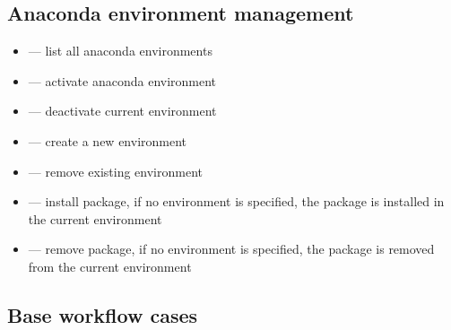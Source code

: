 \documentclass[12pt]{article}
\begin{document}
\subsection{Anaconda environment management}
\begin{itemize}
  \item {} --- list all anaconda environments
  \item {} --- activate anaconda environment
  \item {} --- deactivate current environment
  \item {} --- create a new environment
  \item {} --- remove existing environment
  \item {} --- install package, if no environment is specified, the package is installed in the current environment
  \item {} --- remove package, if no environment is specified, the package is removed from the current environment
\end{itemize}

\subsection{Base workflow cases}
\end{document}

